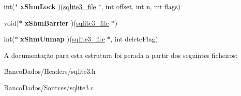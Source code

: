 \begin{DoxyCompactItemize}
\item 
\hypertarget{structsqlite3__io__methods_a58f4a6b0df86440029cc5fa1b65b1b4e}{int($\ast$ {\bfseries x\-Shm\-Lock} )(\hyperlink{structsqlite3__file}{sqlite3\-\_\-file} $\ast$, int offset, int n, int flags)}\label{structsqlite3__io__methods_a58f4a6b0df86440029cc5fa1b65b1b4e}

\item 
\hypertarget{structsqlite3__io__methods_aedf4a59fa25ad33e0625a2aa0f6f2184}{void($\ast$ {\bfseries x\-Shm\-Barrier} )(\hyperlink{structsqlite3__file}{sqlite3\-\_\-file} $\ast$)}\label{structsqlite3__io__methods_aedf4a59fa25ad33e0625a2aa0f6f2184}

\item 
\hypertarget{structsqlite3__io__methods_af69cbc7ece1854576ac262f986871563}{int($\ast$ {\bfseries x\-Shm\-Unmap} )(\hyperlink{structsqlite3__file}{sqlite3\-\_\-file} $\ast$, int delete\-Flag)}\label{structsqlite3__io__methods_af69cbc7ece1854576ac262f986871563}

\end{DoxyCompactItemize}


A documentação para esta estrutura foi gerada a partir dos seguintes ficheiros\-:\begin{DoxyCompactItemize}
\item 
Banco\-Dados/\-Headers/sqlite3.\-h\item 
Banco\-Dados/\-Sources/sqlite3.\-c\end{DoxyCompactItemize}
